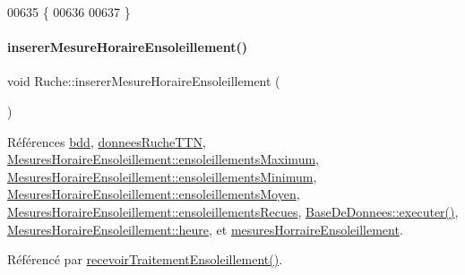 \begin{DoxyCode}
00635 \{
00636 
00637 \}
\end{DoxyCode}
\mbox{\label{class_ruche_a658234b9d96541d204b95b74556742b6}} 
\paragraph{\texorpdfstring{inserer\+Mesure\+Horaire\+Ensoleillement()}{insererMesureHoraireEnsoleillement()}}
{\footnotesize\ttfamily void Ruche\+::inserer\+Mesure\+Horaire\+Ensoleillement (\begin{DoxyParamCaption}{ }\end{DoxyParamCaption})\hspace{0.3cm}{\ttfamily [private]}}



Références \hyperlink{class_ruche_a8577fdedabdecd98652e338e83bb3b65}{bdd}, \hyperlink{class_ruche_a4556832042641c08a6ef2ab9d80d771e}{donnees\+Ruche\+T\+TN}, \hyperlink{struct_mesures_horaire_ensoleillement_adc848a942c5dcb0984b4c346f07e6f09}{Mesures\+Horaire\+Ensoleillement\+::ensoleillements\+Maximum}, \hyperlink{struct_mesures_horaire_ensoleillement_a5d1165f40806663a3fd40ee4408c78f1}{Mesures\+Horaire\+Ensoleillement\+::ensoleillements\+Minimum}, \hyperlink{struct_mesures_horaire_ensoleillement_a41c11dd16f5e42cf8b4882f98b9cee49}{Mesures\+Horaire\+Ensoleillement\+::ensoleillements\+Moyen}, \hyperlink{struct_mesures_horaire_ensoleillement_a78d40966edb1ace93776ba33edfc5151}{Mesures\+Horaire\+Ensoleillement\+::ensoleillements\+Recues}, \hyperlink{class_base_de_donnees_aa8de5f8f8bb17edc43f5c0ee33712081}{Base\+De\+Donnees\+::executer()}, \hyperlink{struct_mesures_horaire_ensoleillement_a478cf936fa746f384445cf5077206454}{Mesures\+Horaire\+Ensoleillement\+::heure}, et \hyperlink{class_ruche_a5e57df1ce7805b1ab0f6d8ef37504582}{mesures\+Horraire\+Ensoleillement}.



Référencé par \hyperlink{class_ruche_a2ac5766ce8652084f034c498691488ea}{recevoir\+Traitement\+Ensoleillement()}.


